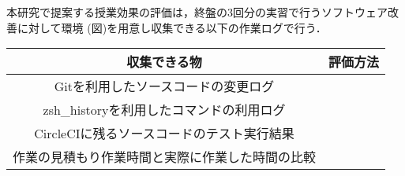 本研究で提案する授業効果の評価は，終盤の3回分の実習で行うソフトウェア改善に対して環境 (図)を用意し収集できる以下の作業ログで行う．

\begin{table}[ht]
  \begin{center}
    \begin{tabular}{|c|c|}
      \hline
      収集できる物 & 評価方法 \\
      \hline
      Gitを利用したソースコードの変更ログ& \\
      \hline
      zsh\_historyを利用したコマンドの利用ログ & \\
      \hline
      CircleCIに残るソースコードのテスト実行結果 & \\
      \hline
      作業の見積もり作業時間と実際に作業した時間の比較 & \\
      \hline
    \end{tabular}
  \end{center}
\end{table}
